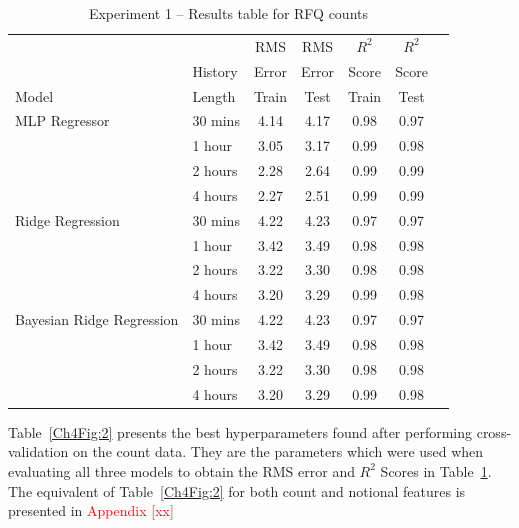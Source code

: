 \begin{table}[!ht]\centering\small
    \caption{Experiment 1 -- Results table for RFQ counts}\label{Ch4Tab:1}
    \begin{tabular}{llccccc}
        \toprule
              &         & RMS   & RMS   & $R^2$ & $R^2$  \\
              & History & Error & Error & Score      & Score       \\
        Model & Length  & Train & Test  & Train      & Test        \\
        \midrule
        MLP Regressor
              & 30 mins & 4.14  & 4.17  & 0.98       & 0.97        \\
              & 1 hour  & 3.05  & 3.17  & 0.99       & 0.98        \\
              & 2 hours & 2.28  & 2.64  & 0.99       & 0.99        \\
              & 4 hours & 2.27  & 2.51  & 0.99       & 0.99        \\
        \midrule
        Ridge Regression
              & 30 mins & 4.22  & 4.23   & 0.97     &  0.97           \\
              & 1 hour  & 3.42  & 3.49   & 0.98    &  0.98          \\
              & 2 hours & 3.22  & 3.30    & 0.98    &  0.98           \\
              & 4 hours & 3.20   & 3.29   & 0.99    &   0.98          \\
        \midrule
        Bayesian Ridge Regression
              & 30 mins & 4.22  & 4.23   & 0.97     &  0.97           \\
              & 1 hour  & 3.42  & 3.49   & 0.98     &   0.98           \\
              & 2 hours & 3.22  & 3.30    & 0.98      &    0.98          \\
              & 4 hours & 3.20   &3.29    & 0.99     &    0.98          \\      
        \bottomrule
    \end{tabular}
\end{table}

Table~\ref{Ch4Fig:2} presents the best hyperparameters found after performing cross-validation on the count data. They are the parameters which were used when evaluating all three models to obtain the RMS error and $R^2$ Scores in Table~\ref{Ch4Tab:1}. The equivalent of Table~\ref{Ch4Fig:2} for both count and notional features is presented in \textcolor{red}{Appendix [xx]}

